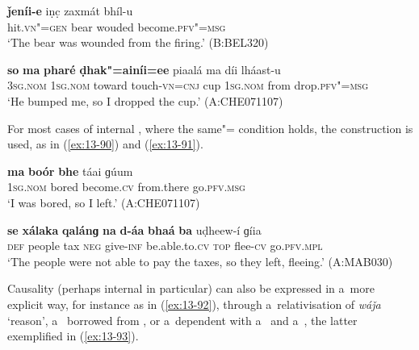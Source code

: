 \ex
\label{ex:13-88}
\gll \textbf{ǰeníi-e} iṇc̣ zaxmát bhíl-u \\
hit.\textsc{vn"=gen} bear wouded become.\textsc{pfv"=msg} \\
\glt `The bear was wounded from the firing.' (B:BEL320)

\ex
\label{ex:13-89}
\gll \textbf{so} \textbf{ma} \textbf{pharé} \textbf{ḍhak"=ainíi=ee} piaalá ma díi lháast-u\\
\textsc{3sg.nom} \textsc{1sg.nom} toward touch-\textsc{vn=cnj} cup \textsc{1sg.nom} from drop.\textsc{pfv"=msg}\\
\glt `He bumped me, so I dropped the cup.' (A:CHE071107) 
\z

For most cases of internal , where the same"= condition holds, the  construction is used, as in (\ref{ex:13-90}) and (\ref{ex:13-91}).

\begin{exe}
\ex
\label{ex:13-90}
\gll \textbf{ma} \textbf{boór} \textbf{bhe} táai ɡúum  \\
\textsc{1sg.nom} bored become.\textsc{cv} from.there go.\textsc{pfv.msg}  \\
\glt `I was bored, so I left.' (A:CHE071107)

\ex
\label{ex:13-91}
\gll \textbf{se} \textbf{xálaka} \textbf{qalánɡ} \textbf{na} \textbf{d-áa} \textbf{bhaá} \textbf{ba} uḍheew-í ɡíia \\
 \textsc{def} people tax \textsc{neg} give-\textsc{inf} be.able.to.\textsc{cv} \textsc{top} flee-\textsc{cv}  go.\textsc{pfv.mpl}   \\
\glt `The people were not able to pay the taxes, so they left, fleeing.' (A:MAB030) 
\end{exe}

Causality (perhaps internal in particular) can also be expressed in a~more explicit way, for instance as in (\ref{ex:13-92}), through a~relativisation of \textit{wáǰa} `reason', a~ borrowed from \iliPashto, or a~dependent  with a~ and a~, the latter exemplified in (\ref{ex:13-93}).

